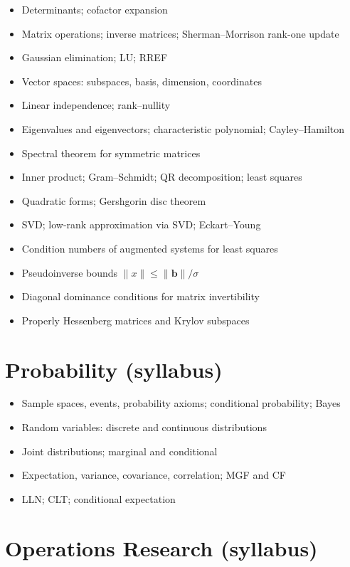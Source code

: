 \documentclass{amsart}
\begin{document}
\begin{itemize}
  \item Determinants; cofactor expansion
  \item Matrix operations; inverse matrices; Sherman--Morrison rank-one update
  \item Gaussian elimination; LU; RREF
  \item Vector spaces: subspaces, basis, dimension, coordinates
  \item Linear independence; rank--nullity
  \item Eigenvalues and eigenvectors; characteristic polynomial; Cayley--Hamilton
  \item Spectral theorem for symmetric matrices
  \item Inner product; Gram--Schmidt; QR decomposition; least squares
  \item Quadratic forms; Gershgorin disc theorem
  \item SVD; low-rank approximation via SVD; Eckart--Young
  \item Condition numbers of augmented systems for least squares
  \item Pseudoinverse bounds $\|x\| \leq \|\mathbf{b}\|/\sigma$
  \item Diagonal dominance conditions for matrix invertibility
  \item Properly Hessenberg matrices and Krylov subspaces
\end{itemize}

\section{Probability (syllabus)}

\begin{itemize}
  \item Sample spaces, events, probability axioms; conditional probability; Bayes
  \item Random variables: discrete and continuous distributions
  \item Joint distributions; marginal and conditional
  \item Expectation, variance, covariance, correlation; MGF and CF
  \item LLN; CLT; conditional expectation
\end{itemize}

\section{Operations Research (syllabus)}
\end{document}
